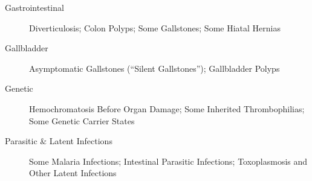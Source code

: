\begin{description}
\item[Gastrointestinal] Diverticulosis; Colon Polyps; Some Gallstones; Some Hiatal Hernias

\item[Gallbladder] Asymptomatic Gallstones (``Silent Gallstones''); Gallbladder Polyps

\item[Genetic] Hemochromatosis Before Organ Damage; Some Inherited Thrombophilias; Some Genetic Carrier States

\item[Parasitic \& Latent Infections] Some Malaria Infections; Intestinal Parasitic Infections; Toxoplasmosis and Other Latent Infections
\end{description}
